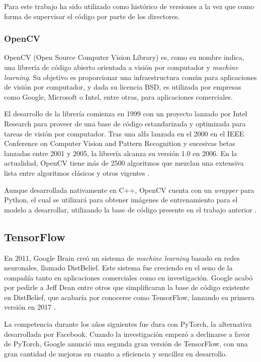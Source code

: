 Para este trabajo ha sido utilizado como histórico de versiones a la vez que como forma de supervisar el código por parte de los directores.

\subsubsection*{OpenCV}

OpenCV (Open Source Computer Vision Library) es, como su nombre indica, una librería de código abierto orientada a visión por computador y \textit{machine learning}. Su objetivo es proporcionar una infraestructura común para aplicaciones de visión por computador, y dada su licencia BSD, es utilizada por empresas como Google, Microsoft o Intel, entre otras, para aplicaciones comerciales.

El desarrollo de la librería comienza en 1999 con un proyecto lanzado por Intel Research para proveer de una base de código estandarizada y optimizada para tareas de visión por computador. Tras una alfa lanzada en el 2000 en el IEEE Conference on Computer Vision and Pattern Recognition y sucesivas betas lanzadas entre 2001 y 2005, la librería alcanza su versión 1.0 en 2006. En la actualidad, OpenCV tiene más de 2500 algoritmos que mezclan una extensiva lista entre algoritmos clásicos y otros vigentes \cite{opencv}.

Aunque desarrollada nativamente en C++, OpenCV cuenta con un \textit{wrapper} para Python, el cual se utilizará para obtener imágenes de entrenamiento para el modelo a desarrollar, utilizando la base de código presente en el trabajo anterior \cite{tfg}.

\subsection*{TensorFlow}

En 2011, Google Brain creó un sistema de \textit{machine learning} basado en redes neuronales, llamado DistBelief. Este sistema fue creciendo en el seno de la compañía tanto en aplicaciones comerciales como en investigación. Google acabó por pedirle a Jeff Dean entre otros que simplificaran la base de código existente en DistBelief, que acabaría por conocerse como TensorFlow, lanzando su primera versión en 2017 \cite{TensorFlow2015-whitepaper}.

La competencia durante los años siguientes fue dura con PyTorch, la alternativa desarrollada por Facebook. Cuando la investigación empezó a declinarse a favor de PyTorch, Google anunció una segunda gran versión de TensorFlow, con una gran cantidad de mejoras en cuanto a eficiencia y sencillez en desarrollo. 

